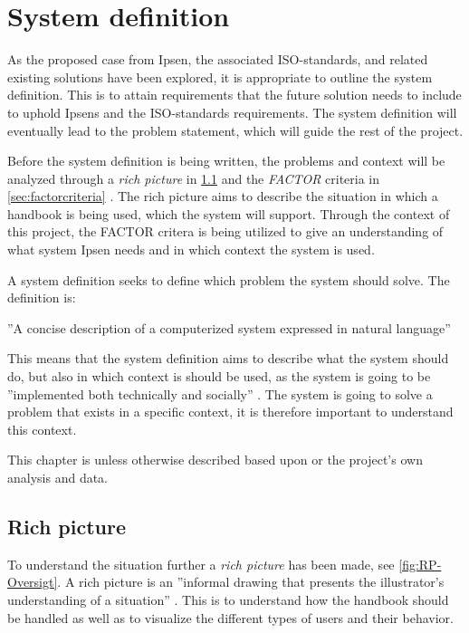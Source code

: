\section{System definition}\label{sec:SystemDefinition}
As the proposed case from Ipsen, the associated ISO-standards, and related existing solutions have been explored, it is appropriate to outline the system definition.
This is to attain requirements that the future solution needs to include to uphold Ipsens and the ISO-standards requirements.
The system definition will eventually lead to the problem statement, which will guide the rest of the project.

Before the system definition is being written, the problems and context will be analyzed through a \textit{rich picture} in \cref{sec:richpictures} and the \textit{FACTOR} criteria in \cref{sec:factorcriteria} \citep{Rod-Aalborg}.
The rich picture aims to describe the situation in which a handbook is being used, which the system will support.
Through the context of this project, the FACTOR critera is being utilized to give an understanding of what system Ipsen needs and in which context the system is used.

A system definition seeks to define which problem the system should solve.
The definition is: \citep[p.~24]{Rod-Aalborg}

\begin{defn}
''A concise description of a computerized system expressed in natural language''
\end{defn}

This means that the system definition aims to describe what the system should do, but also in which context is should be used, as the system is going to be ''implemented both technically and socially'' \citep[p.~23]{Rod-Aalborg}.
The system is going to solve a problem that exists in a specific context, it is therefore important to understand this context.

This chapter is unless otherwise described based upon \cite{Rod-Aalborg} or the project's own analysis and data.

\subsection{Rich picture} \label{sec:richpictures}

To understand the situation further a \textit{rich picture} has been made, see \cref{fig:RP-Oversigt}. A rich picture is an ''informal drawing that presents the illustrator's understanding of a situation'' \citep[~p. 26]{Rod-Aalborg}.
This is to understand how the handbook should be handled as well as to visualize the different types of users and their behavior.

